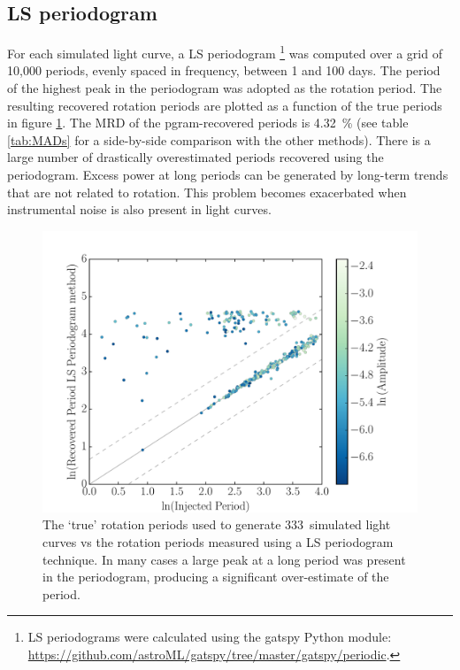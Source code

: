 \documentclass[useAMS, usenatbib, preprint, 12pt]{aastex}
\newcommand{\naigrain}{333}
\newcommand{\percentpgramMAD}{4.32}
\begin{document}
\subsection{LS periodogram}

For each simulated light curve, a LS periodogram
\footnote{LS periodograms were calculated using the gatspy Python module:
\url{https://github.com/astroML/gatspy/tree/master/gatspy/periodic}.}
was computed over a grid of 10,000 periods, evenly spaced in frequency,
between 1 and 100 days.
The period of the highest peak in the periodogram was adopted as the rotation
period.
The resulting recovered rotation periods are plotted as a function of the true
periods in figure \ref{fig:pgram_compare}.
The MRD of the pgram-recovered periods is \percentpgramMAD\ \% (see table
\ref{tab:MADs} for a side-by-side comparison with the other methods).
There is a large number of drastically overestimated periods recovered using
the periodogram.
Excess power at long periods can be generated by long-term trends that are not
related to rotation.
This problem becomes exacerbated when instrumental noise is also present in
light curves.

\begin{figure}
\begin{center}
\includegraphics[width=6in, clip=true]{figures/compare_pgram.pdf}
\caption[LS periodogram results.]
{The `true' rotation periods used to generate \naigrain\ simulated light
curves vs the rotation periods measured using a LS periodogram technique.
In many cases a large peak at a long period was present in the periodogram,
    producing a significant over-estimate of the period.
    }
\label{fig:pgram_compare}
\end{center}
\end{figure}
\end{document}
